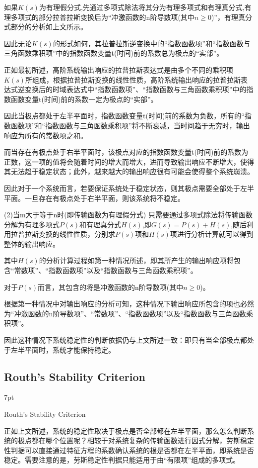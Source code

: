 \documentclass{article}
\numberwithin{equation}{section}
\numberwithin{figure}{section}
\newenvironment{formal}{%
\def\FrameCommand{%
\hspace{1pt}%
{\color{DarkBlue}\vrule width 2pt}%
{\color{formalshade}\vrule width 4pt}%
\colorbox{formalshade}%
}%
\MakeFramed{\advance\hsize-\width\FrameRestore}%
\noindent\hspace{-4.55pt}%
\begin{adjustwidth}{}{7pt}%
\vspace{2pt}\vspace{2pt}%
}
{%
\vspace{2pt}\end{adjustwidth}\endMakeFramed%
}
\begin{document}
如果$K(s)$为有理假分式,先通过多项式除法将其分为有理多项式和有理真分式,有理多项式的部分拉普拉斯变换后为“冲激函数的n阶导数项(其中$n≥0$)”，有理真分式部分的分析如上文所示。

因此无论$K(s)$的形式如何，其拉普拉斯逆变换中的“指数函数项”和“指数函数与三角函数乘积项”中的指数函数变量t(时间)前的系数总为极点的“实部”。

正如最初所述，高阶系统输出响应的拉普拉斯表达式是由多个不同的乘积项$K(s)$所组成，根据拉普拉斯变换的线性性质，高阶系统输出响应的拉普拉斯表达式逆变换后的时域表达式中“指数函数项”、“指数函数与三角函数乘积项”中的指数函数变量t(时间)前的系数一定为极点的“实部”。

因此当极点都处于左半平面时，指数函数变量t(时间)前的系数为负数，所有的“指数函数项”和“指数函数与三角函数乘积项”将不断衰减，当时间趋于无穷时，输出响应为所有的常数项之和。

而当存在有极点处于右半平面时，该极点对应的指数函数变量t(时间)前的系数为正数，这一项的值将会随着时间的增大而增大，进而导致输出响应不断增大，使得其无法趋于稳定状态；此外，越来越大的输出响应很有可能会使得整个系统崩溃。

因此对于一个系统而言，若要保证系统处于稳定状态，则其极点需要全部处于左半平面。一旦存在有极点处于右半平面，则该系统将不稳定。


(2)当m大于等于n时(即传输函数为有理假分式)
只需要通过多项式除法将传输函数分解为有理多项式$P(s)$和有理真分式$H(s)$,即$G(s)=P(s)+H(s)$,随后利用拉普拉斯变换的线性性质，分别求$P(s)$项和$H(s)$项进行分析计算就可以得到整体的输出响应。

其中$H(s)$的分析计算过程如第一种情况所述，即其所产生的输出响应项将包含“常数项”、“指数函数项”以及“指数函数与三角函数乘积项”。

对于$P(s)$而言，其包含的将是冲激函数的n阶导数项(其中$n≥0$)。

根据第一种情况中对输出响应的分析可知，这种情况下输出响应所包含的项也必然为“冲激函数的n阶导数项”、“常数项”、“指数函数项”以及“指数函数与三角函数乘积项”。

因此这种情况下系统稳定性的判断依据仍与上文所述一致：即只有当全部极点都处于左半平面时，系统才能保持稳定。

\subsection{Routh's Stability Criterion}
\begin{formal}
    Routh's Stability Criterion
\end{formal}

正如上文所述，系统的稳定性取决于极点是否全部都在左半平面，那么怎么判断系统的极点都在哪个位置呢？相较于对系统复杂的传输函数进行因式分解，劳斯稳定性判据可以直接通过特征方程的系数确认系统的根是否都在左半平面，即系统是否稳定。需要注意的是，劳斯稳定性判据只能适用于由“有限项”组成的多项式。
\end{document}
